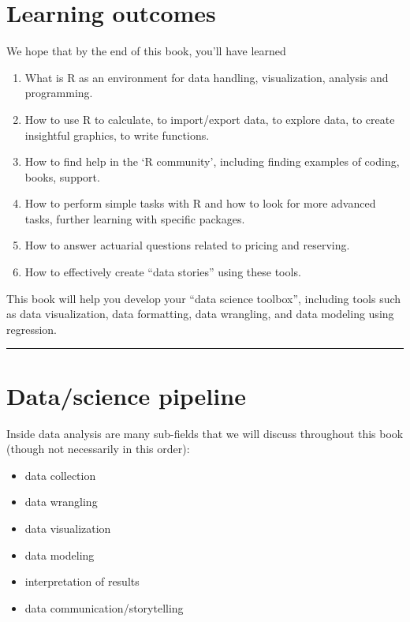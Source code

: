 \documentclass[
]{book}
\providecommand{\tightlist}{%
  \setlength{\itemsep}{0pt}\setlength{\parskip}{0pt}}
\begin{document}
\hypertarget{subsec:learning-goals}{%
\section{Learning outcomes}\label{subsec:learning-goals}}

We hope that by the end of this book, you'll have learned

\begin{enumerate}
\def\labelenumi{\arabic{enumi}.}
\tightlist
\item
  What is R as an environment for data handling, visualization, analysis and programming.
\item
  How to use R to calculate, to import/export data, to explore data, to create
  insightful graphics, to write functions.
\item
  How to find help in the `R community', including finding examples of coding, books, support.
\item
  How to perform simple tasks with R and how to look for
  more advanced tasks, further learning with specific packages.
\item
  How to answer actuarial questions related to pricing and reserving.
\item
  How to effectively create ``data stories'' using these tools.
\end{enumerate}

This book will help you develop your ``data science toolbox'', including tools such as data visualization, data formatting, data wrangling, and data modeling using regression.

\begin{center}\rule{0.5\linewidth}{0.5pt}\end{center}

\hypertarget{subsec:pipeline}{%
\section{Data/science pipeline}\label{subsec:pipeline}}

Inside data analysis are many sub-fields that we will discuss throughout this book (though not necessarily in this order):

\begin{itemize}
\tightlist
\item
  data collection
\item
  data wrangling
\item
  data visualization
\item
  data modeling
\item
  interpretation of results
\item
  data communication/storytelling
\end{itemize}
\end{document}

